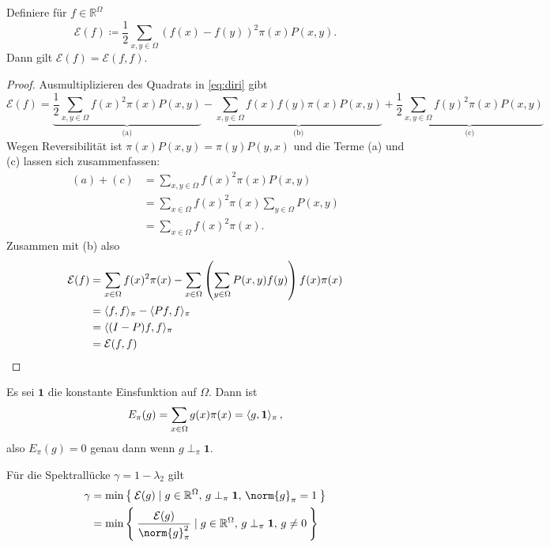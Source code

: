\documentclass[ngerman,a4paper,11pt]{scrartcl}
\newcommand{\diri}{\mathcal{E}}
\newcommand{\RR}{\mathbb{R}}
\DeclarePairedDelimiter{\sprod}{\langle}{\rangle}	%
\begin{document}
\begin{lem}
 \label{lem:diri}
 Definiere für $f\in\RR^\Omega$
 \begin{equation}
  \label{eq:diri}
  \diri(f)\coloneqq\frac{1}{2}\sum_{x,y\in\Omega}(f(x)-f(y))^2\pi(x)P(x,y).
 \end{equation}
 Dann gilt $\diri(f)=\diri(f,f)$.
\end{lem}
\begin{proof}
  Ausmultiplizieren des Quadrats in \cref{eq:diri} gibt
  \begin{equation*}
   \diri(f)=\underbrace{\frac{1}{2}\sum_{x,y\in\Omega}f(x)^2\pi(x)P(x,y)}_{\text{(a)}}-
   \underbrace{\sum_{x,y\in\Omega}f(x)f(y)\pi(x)P(x,y)}_{\text{(b)}}
   +\underbrace{\frac{1}{2}\sum_{x,y\in\Omega}f(y)^2\pi(x)P(x,y)}_{\text{(c)}}
  \end{equation*}
  Wegen Reversibilität ist $\pi(x)P(x,y)=\pi(y)P(y,x)$ und die Terme (a) und (c)
  lassen sich zusammenfassen:
  \begin{align*}
   (a)+(c)&=\sum_{x,y\in\Omega}f(x)^2\pi(x)P(x,y) \\
   &=\sum_{x\in\Omega}f(x)^2\pi(x)\sum_{y\in\Omega}P(x,y) \\
   &=\sum_{x\in\Omega}f(x)^2\pi(x).
  \end{align*}
  Zusammen mit (b) also
  \begin{align*}
   \diri(f)&=\sum_{x\in\Omega}f(x)^2\pi(x)-\sum_{x\in\Omega}\left(\sum_{y\in\Omega}P(x,y)f(y) \right)f(x)\pi(x) \\
   &=\sprod{f,f}_\pi-\sprod{Pf,f}_\pi \\
   &=\sprod{(I-P)f,f}_\pi \\
   &=\diri(f,f)
  \end{align*}
\end{proof}

\begin{rem}
 Es sei $\mathbf{1}$ die
 konstante Einsfunktion auf $\Omega$. Dann
 ist
 \begin{equation*}
  E_\pi(g)=\sum_{x\in\Omega}g(x)\pi(x)=\sprod{g,\mathbf{1}}_\pi\, ,
 \end{equation*}
 also $E_\pi(g)=0$ genau dann wenn $g\perp_\pi\mathbf{1}$.
\end{rem}

\begin{lem}
 \label{lem:spekdiri}
 Für die Spektrallücke $\gamma=1-\lambda_2$  gilt
 \begin{align}
  \gamma&=\min\Set{\diri(g)\mid g\in\RR^{\Omega} , \, g\perp_\pi\mathbf{1} , \, \norm{g}_\pi=1} \label{eq:min} \\
        &=\min\Set{\frac{\diri(g)}{\norm{g}_\pi^2}\mid g\in\RR^\Omega,\, g\perp_\pi\mathbf{1},\, g\neq 0} \label{eq:min2}
 \end{align}
\end{lem}
\end{document}
